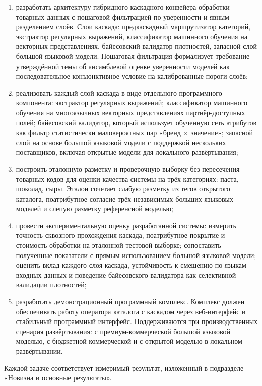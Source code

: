 \begin{enumerate}[label=\arabic*)]
    \item разработать архитектуру гибридного каскадного конвейера обработки товарных данных с пошаговой фильтрацией по уверенности и явным разделением слоёв. Слои каскада: предкаскадный маршрутизатор категорий, экстрактор регулярных выражений, классификатор машинного обучения на векторных представлениях, байесовский валидатор плотностей, запасной слой большой языковой модели. Пошаговая фильтрация формализует требование утверждённой темы об ансамблевой оценке уверенности моделей как последовательное конъюнктивное условие на калиброванные пороги слоёв;
    \item реализовать каждый слой каскада в виде отдельного программного компонента: экстрактор регулярных выражений; классификатор машинного обучения на многоязычных векторных представлениях партнёр-доступных полей; байесовский валидатор, который использует обученную сеть атрибутов как фильтр статистически маловероятных пар «бренд × значение»; запасной слой на основе большой языковой модели с поддержкой нескольких поставщиков, включая открытые модели для локального развёртывания;
    \item построить эталонную разметку и проверочную выборку без пересечения товарных кодов для оценки качества системы на трёх категориях: паста, шоколад, сыры. Эталон сочетает слабую разметку из тегов открытого каталога, поатрибутное согласие трёх независимых больших языковых моделей и слепую разметку референсной моделью;
    \item провести экспериментальную оценку разработанной системы: измерить точность сквозного прохождения каскада, поатрибутное покрытие и стоимость обработки на эталонной тестовой выборке; сопоставить полученные показатели с прямым использованием большой языковой модели; оценить вклад каждого слоя каскада, устойчивость к смещению по языкам входных данных и поведение байесовского валидатора как селективной валидации плотностей;
    \item разработать демонстрационный программный комплекс. Комплекс должен обеспечивать работу оператора каталога с каскадом через веб-интерфейс и стабильный программный интерфейс. Поддерживаются три производственных сценария развёртывания: с премиум-коммерческой большой языковой моделью, с бюджетной коммерческой и с открытой моделью в локальном развёртывании.
\end{enumerate}

Каждой задаче соответствует измеримый результат, изложенный в подразделе «Новизна и основные результаты».

